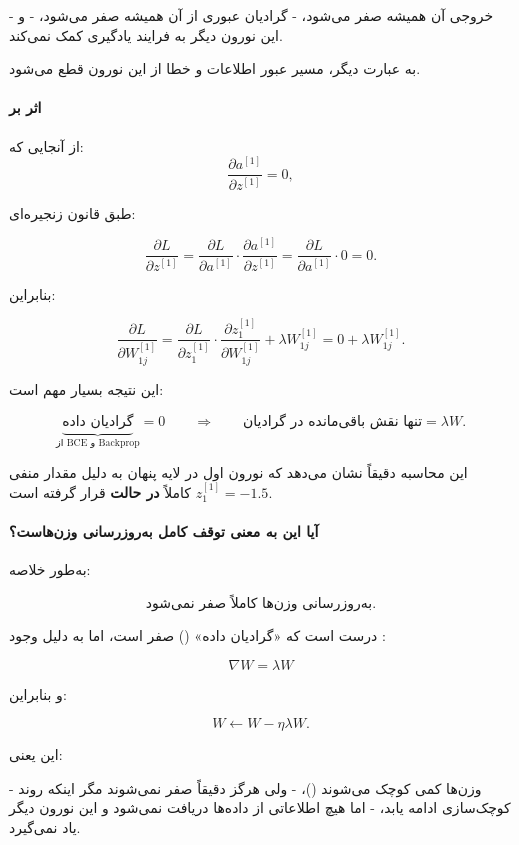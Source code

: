 \documentclass{article}
\begin{document}
- خروجی آن همیشه صفر می‌شود،
- گرادیان عبوری از آن همیشه صفر می‌شود،
- و این نورون دیگر به فرایند یادگیری کمک نمی‌کند.

به عبارت دیگر، مسیر عبور اطلاعات و خطا از این نورون قطع می‌شود.

\paragraph{اثر  بر }

از آنجایی که:
\[
\frac{\partial a^{[1]}}{\partial z^{[1]}} = 0,
\]

طبق قانون زنجیره‌ای:

\[
\frac{\partial L}{\partial z^{[1]}}
=
\frac{\partial L}{\partial a^{[1]}}
\cdot
\frac{\partial a^{[1]}}{\partial z^{[1]}}
=
\frac{\partial L}{\partial a^{[1]}}
\cdot 0
=
0.
\]

بنابراین:

\[
\frac{\partial L}{\partial W^{[1]}_{1j}}
=
\frac{\partial L}{\partial z^{[1]}_1}
\cdot
\frac{\partial z^{[1]}_1}{\partial W^{[1]}_{1j}}
+
\lambda W^{[1]}_{1j}
=
0 + \lambda W^{[1]}_{1j}.
\]

این نتیجه بسیار مهم است:

\[
\underbrace{\text{گرادیان داده}}_{\text{از BCE و Backprop}} = 0
\qquad\Longrightarrow\qquad
\text{تنها نقش باقی‌مانده در گرادیان} = \lambda W.
\]


این محاسبه دقیقاً نشان می‌دهد که نورون اول در لایه پنهان به دلیل مقدار منفی
\(
z^{[1]}_1 = -1.5
\)
کاملاً \textbf{در حالت } قرار گرفته است.

\paragraph{آیا این به معنی توقف کامل به‌روزرسانی وزن‌هاست؟}

به‌طور خلاصه:

\[
\text{به‌روزرسانی وزن‌ها کاملاً صفر نمی‌شود.}
\]

درست است که «گرادیان داده» () صفر است،  
اما به دلیل وجود :

\[
\nabla W = \lambda W
\]

و بنابراین:

\[
W \leftarrow W - \eta \lambda W.
\]

این یعنی:

- وزن‌ها کمی کوچک می‌شوند ()،
- ولی هرگز دقیقاً صفر نمی‌شوند مگر اینکه روند کوچک‌سازی ادامه یابد،
- اما هیچ اطلاعاتی از داده‌ها دریافت نمی‌شود و این نورون دیگر یاد نمی‌گیرد.
\end{document}
